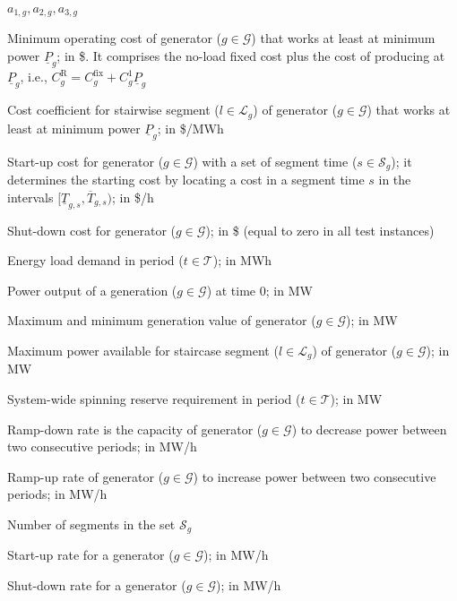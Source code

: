 \begin{labeling}{$a_{1,g},a_{2,g},a_{3,g}$}
\setlength\itemsep{0.1em}
\item[$C^{\text{R}}_{g}$] Minimum operating cost of generator ($g\in\mathcal{G}$) that works at least at minimum power $\underline{P}_{g}$; in \$. It comprises the no-load fixed cost plus the cost of producing at $\underline{P}_{g}$, i.e., $C^{\text{R}}_{g}= C^{\text{fix}}_{g} + C^{1}_{g}\underline{P}_{g}$
\item[$C^{l}_{g}$] Cost coefficient for stairwise segment ($l\in\mathcal{L}_g$) of generator ($g\in\mathcal{G}$) that works at least at minimum power $\underline{P}_{g}$; in \$/MWh
\item[$C^{\text{S}}_{g,s}$] Start-up cost for generator ($g\in\mathcal{G}$) with a set of segment time ($s\in\mathcal{S}_{g}$); it determines the starting cost by locating a cost in a segment time $s$ in the intervals $[\underline{T}_{g,s},\overline{T}_{g,s})$; in \$/h
\item[$C^{\text{SD}}_{g}$] Shut-down cost for generator ($g\in\mathcal{G}$); in \$ (equal to zero in all test instances)
\item[$\textit{De}_{t}$] Energy load demand in period ($t\in\mathcal{T}$); in MWh %
\item[${p}_{g,0}$] Power output of a generation ($g\in\mathcal{G}$) at time 0; in MW
\item[$\overline{P}_{g}$,$\underline{P}_{g}$] Maximum and minimum generation value of generator ($g\in\mathcal{G}$); in MW
\item[$\overline{P}_{g}^{l}$] Maximum power available for staircase segment ($l\in\mathcal{L}_g$) of generator ($g\in\mathcal{G}$); in MW
\item[$R_{t}$] System-wide spinning reserve requirement in period ($t\in\mathcal{T}$); in MW
\item[$\textit{RD}_{g}$] Ramp-down rate is the capacity of generator ($g\in\mathcal{G}$) to decrease power between two consecutive periods; in MW/h
\item[$\textit{RU}_{g}$] Ramp-up rate of generator ($g\in\mathcal{G}$) to increase power between two consecutive periods; in MW/h
\item[$|\mathcal{S}_g|$] Number of segments in the set $\mathcal{S}_g$ 
\item[$\textit{SU}_{g}$] Start-up rate for a generator ($g\in\mathcal{G}$); in MW/h
\item[$\textit{SD}_{g}$] Shut-down rate for a generator ($g\in\mathcal{G}$); in MW/h

\end{labeling}
